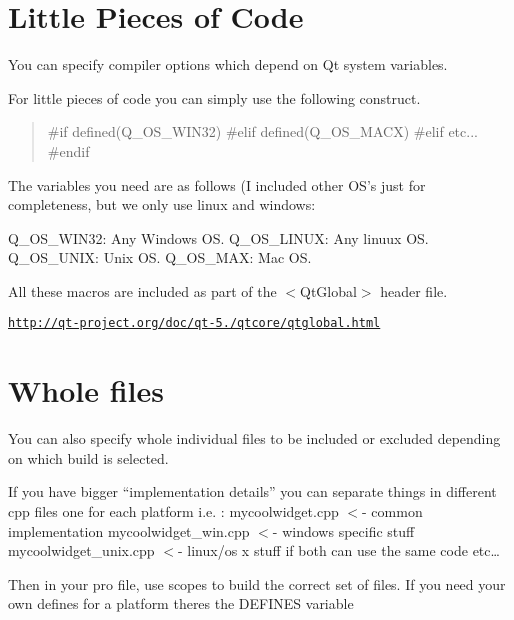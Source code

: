 \section*{Little Pieces of Code}

You can specify compiler options which depend on Qt system variables.

For little pieces of code you can simply use the following construct.

\begin{quotation}
\#if defined(\-Q\-\_\-\-O\-S\-\_\-\-W\-I\-N32) \#elif defined(\-Q\-\_\-\-O\-S\-\_\-\-M\-A\-C\-X) \#elif etc... \#endif

\end{quotation}


The variables you need are as follows (I included other O\-S's just for completeness, but we only use linux and windows\-:


\begin{DoxyEnumerate}
\item Q\-\_\-\-O\-S\-\_\-\-W\-I\-N32\-: Any Windows O\-S. Q\-\_\-\-O\-S\-\_\-\-L\-I\-N\-U\-X\-: Any linuux O\-S. Q\-\_\-\-O\-S\-\_\-\-U\-N\-I\-X\-: Unix O\-S. Q\-\_\-\-O\-S\-\_\-\-M\-A\-X\-: Mac O\-S.
\end{DoxyEnumerate}

All these macros are included as part of the $<$\-Qt\-Global$>$ header file.

\href{http://qt-project.org/doc/qt-5.0/qtcore/qtglobal.html}{\tt http\-://qt-\/project.\-org/doc/qt-\/5./qtcore/qtglobal.\-html}

\section*{Whole files}

You can also specify whole individual files to be included or excluded depending on which build is selected.

If you have bigger “implementation details” you can separate things in different cpp files one for each platform i.\-e. \-: mycoolwidget.\-cpp $<$-\/ common implementation mycoolwidget\-\_\-win.\-cpp $<$-\/ windows specific stuff mycoolwidget\-\_\-unix.\-cpp $<$-\/ linux/os x stuff if both can use the same code etc…

Then in your pro file, use scopes to build the correct set of files. If you need your own defines for a platform theres the D\-E\-F\-I\-N\-E\-S variable 
